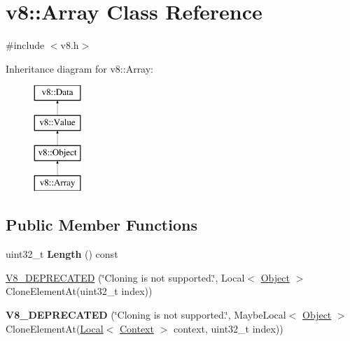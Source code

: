 \hypertarget{classv8_1_1_array}{}\section{v8\+:\+:Array Class Reference}
\label{classv8_1_1_array}


{\ttfamily \#include $<$v8.\+h$>$}

Inheritance diagram for v8\+:\+:Array\+:\begin{figure}[H]
\begin{center}
\leavevmode
\includegraphics[height=4.000000cm]{classv8_1_1_array}
\end{center}
\end{figure}
\subsection*{Public Member Functions}
\begin{DoxyCompactItemize}
\item 
uint32\+\_\+t {\bfseries Length} () const \hypertarget{classv8_1_1_array_a3c47dfd8d26e60ed4fcdc683034d6d9c}{}\label{classv8_1_1_array_a3c47dfd8d26e60ed4fcdc683034d6d9c}

\item 
\hyperlink{classv8_1_1_array_ae4d15fb9781bcd653e5eecffd4d0ffac}{V8\+\_\+\+D\+E\+P\+R\+E\+C\+A\+T\+ED} (\char`\"{}Cloning is not supported.\char`\"{}, Local$<$ \hyperlink{classv8_1_1_object}{Object} $>$ Clone\+Element\+At(uint32\+\_\+t index))
\item 
{\bfseries V8\+\_\+\+D\+E\+P\+R\+E\+C\+A\+T\+ED} (\char`\"{}Cloning is not supported.\char`\"{}, Maybe\+Local$<$ \hyperlink{classv8_1_1_object}{Object} $>$ Clone\+Element\+At(\hyperlink{classv8_1_1_local}{Local}$<$ \hyperlink{classv8_1_1_context}{Context} $>$ context,                                                                                                                                                                                               uint32\+\_\+t index))\hypertarget{classv8_1_1_array_ae30e4a34fc94cd4b52cd21d508b6e3b7}{}\label{classv8_1_1_array_ae30e4a34fc94cd4b52cd21d508b6e3b7}

\end{DoxyCompactItemize}
